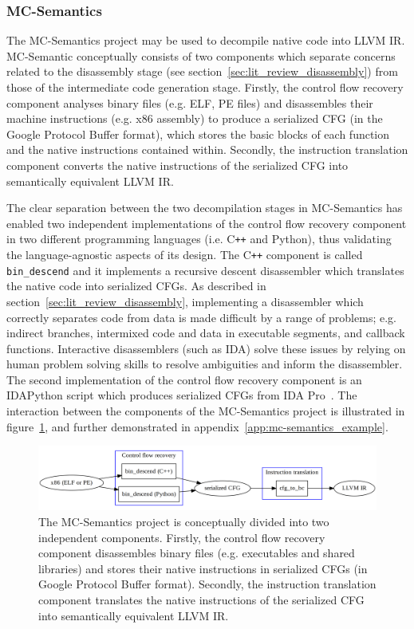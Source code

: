 
\subsubsection{MC-Semantics}
\label{sec:rel_work_mc-semantics}

The MC-Semantics project may be used to decompile native code into LLVM IR. MC-Semantic conceptually consists of two components which separate concerns related to the disassembly stage (see section~\ref{sec:lit_review_disassembly}) from those of the intermediate code generation stage. Firstly, the control flow recovery component analyses binary files (e.g. ELF, PE files) and disassembles their machine instructions (e.g. x86 assembly) to produce a serialized CFG (in the Google Protocol Buffer format), which stores the basic blocks of each function and the native instructions contained within. Secondly, the instruction translation component converts the native instructions of the serialized CFG into semantically equivalent LLVM IR.

The clear separation between the two decompilation stages in MC-Semantics has enabled two independent implementations of the control flow recovery component in two different programming languages (i.e. C\texttt{++} and Python), thus validating the language-agnostic aspects of its design. The C\texttt{++} component is called \texttt{bin\_descend} and it implements a recursive descent disassembler which translates the native code into serialized CFGs. As described in section~\ref{sec:lit_review_disassembly}, implementing a disassembler which correctly separates code from data is made difficult by a range of problems; e.g. indirect branches, intermixed code and data in executable segments, and callback functions. Interactive disassemblers (such as IDA) solve these issues by relying on human problem solving skills to resolve ambiguities and inform the disassembler. The second implementation of the control flow recovery component is an IDAPython script which produces serialized CFGs from IDA Pro~\cite{mcsema}. The interaction between the components of the MC-Semantics project is illustrated in figure~\ref{fig:mcsema_overview}, and further demonstrated in appendix~\ref{app:mc-semantics_example}.

\begin{figure}[htbp]
	\includegraphics[width=\textwidth]{inc/3_rel_work/mcsema_overview.png}
	\caption{The MC-Semantics project is conceptually divided into two independent components. Firstly, the control flow recovery component disassembles binary files (e.g. executables and shared libraries) and stores their native instructions in serialized CFGs (in Google Protocol Buffer format). Secondly, the instruction translation component translates the native instructions of the serialized CFG into semantically equivalent LLVM IR.}
	\label{fig:mcsema_overview}
\end{figure}
